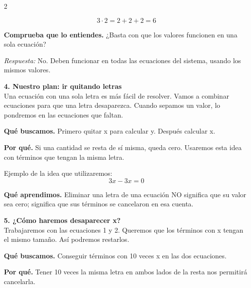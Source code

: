 \documentclass[11pt,a4paper,landscape]{article}
\begin{document}
\begin{multicols*}{2}
\begin{minipage}{\linewidth}
\[3\cdot 2=2+2+2=6\]
\par\smallskip\textbf{Comprueba que lo entiendes.} ¿Basta con que los valores funcionen en una sola ecuación?\par\textit{Respuesta:} No. Deben funcionar en todas las ecuaciones del sistema, usando los mismos valores.
\end{minipage}\par\medskip
\noindent\begin{minipage}{\linewidth}\textbf{4. Nuestro plan: ir quitando letras}\\[2pt]Una ecuación con una sola letra es más fácil de resolver. Vamos a combinar ecuaciones para que una letra desaparezca. Cuando sepamos un valor, lo pondremos en las ecuaciones que faltan.
\par\smallskip\textbf{Qué buscamos.} Primero quitar x para calcular y. Después calcular x.
\par\smallskip\textbf{Por qué.} Si una cantidad se resta de sí misma, queda cero. Usaremos esta idea con términos que tengan la misma letra.
\par\smallskip Ejemplo de la idea que utilizaremos:
\[3x-3x=0\]
\par\smallskip\textbf{Qué aprendimos.} Eliminar una letra de una ecuación NO significa que su valor sea cero; significa que sus términos se cancelaron en esa cuenta.
\end{minipage}\par\medskip
\noindent\begin{minipage}{\linewidth}\textbf{5. ¿Cómo haremos desaparecer x?}\\[2pt]Trabajaremos con las ecuaciones 1 y 2. Queremos que los términos con x tengan el mismo tamaño. Así podremos restarlos.
\par\smallskip\textbf{Qué buscamos.} Conseguir términos con 10 veces x en las dos ecuaciones.
\par\smallskip\textbf{Por qué.} Tener 10 veces la misma letra en ambos lados de la resta nos permitirá cancelarla.
\par{}\par\smallskip

\end{minipage}
\end{multicols*}
\end{document}
